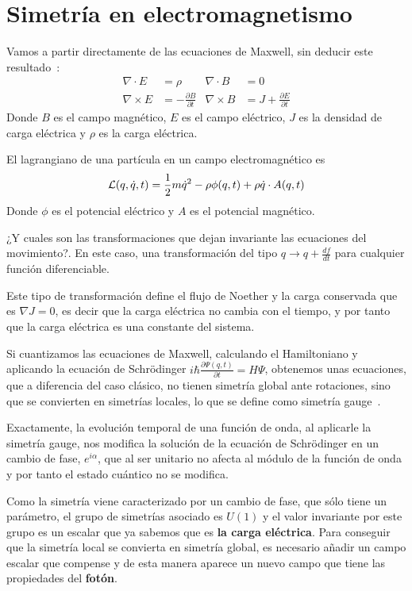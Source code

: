 \section{Simetría en electromagnetismo}\label{sec:simetria-en-electromagnetismo}
Vamos a partir directamente de las ecuaciones de Maxwell, sin deducir este resultado~\autocite[38]{ISMPP}:
\begin{align}
	\label{eq:maxwell}
	\nabla\cdot E & = \rho & \nabla\cdot B & = 0 \\
	\nabla\times E & = -\frac{\partial B}{\partial t} & \nabla\times B & = J+\frac{\partial E}{\partial t}
\end{align}
Donde $B$ es el campo magnético, $E$ es el campo eléctrico, $J$ es la densidad de carga eléctrica y $\rho$ es la carga eléctrica.

El lagrangiano de una partícula en un campo electromagnético es
\begin{equation}
	\label{eq:lagrangiano-electromagnetico}
	\mathcal{L}(q,\dot{q},t)=\frac{1}{2}m\dot{q}^2-\rho\phi(q, t)+\rho\dot{q}\cdot A(q,t)
\end{equation}
Donde $\phi$ es el potencial eléctrico y $A$ es el potencial magnético.

¿Y cuales son las transformaciones que dejan invariante las ecuaciones del movimiento?. En este caso, una transformación del tipo $q\longrightarrow q+\frac{df}{dt}$ para cualquier función diferenciable.

Este tipo de transformación define el flujo de Noether y la carga conservada que es $\nabla J=0$, es decir que la carga eléctrica no cambia con el tiempo, y por tanto que la carga eléctrica es una constante del sistema.

Si cuantizamos las ecuaciones de Maxwell, calculando el Hamiltoniano y aplicando la ecuación de Schrödinger $i\hbar\frac{\partial \Psi(q,t)}{\partial t}=H\Psi$, obtenemos unas ecuaciones, que a diferencia del caso clásico, no tienen simetría global ante rotaciones, sino que se convierten en simetrías locales, lo que se define como simetría gauge~\cite{MAQFT}.

Exactamente, la evolución temporal de una función de onda, al aplicarle la simetría gauge, nos modifica la solución de la ecuación de Schrödinger en un cambio de fase, $e^{i\alpha}$, que al ser unitario no afecta al módulo de la función de onda y por tanto el estado cuántico no se modifica.

Como la simetría viene caracterizado por un cambio de fase, que sólo tiene un parámetro, el grupo de simetrías asociado es $U(1)$ y el valor invariante por este grupo es un escalar que ya sabemos que es \textbf{la carga eléctrica}. Para conseguir que la simetría local se convierta en simetría global, es necesario añadir un campo escalar que compense y de esta manera aparece un nuevo campo que tiene las propiedades del \textbf{fotón}.

